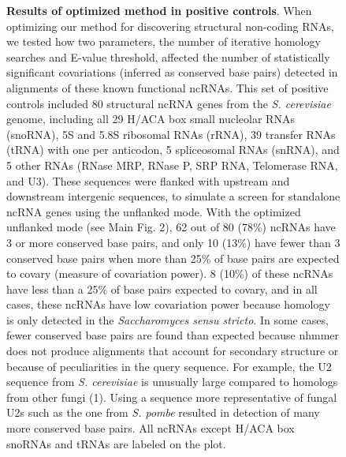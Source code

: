 \documentclass[12pt]{report}
\begin{document}
\begin{figure}[!htb]
	\caption[Results of optimized method in positive controls]{\textbf{Results of optimized method in positive controls}. When optimizing our method for discovering structural non-coding RNAs, we tested how two parameters, the number of iterative homology searches and E-value threshold, affected the number of statistically significant covariations (inferred as conserved base pairs) detected in alignments of these known functional ncRNAs. This set of positive controls included 80 structural ncRNA genes from the \textit{S. cerevisiae} genome, including all 29 H/ACA box small nucleolar RNAs (snoRNA), 5S and 5.8S ribosomal RNAs (rRNA), 39 transfer RNAs (tRNA) with one per anticodon, 5 spliceosomal RNAs (snRNA), and 5 other RNAs (RNase MRP, RNase P, SRP RNA, Telomerase RNA, and U3).  These sequences were flanked with upstream and downstream intergenic sequences, to simulate a screen for standalone ncRNA genes using the unflanked mode. With the optimized unflanked mode (see Main Fig. 2), 62 out of 80 (78\%) ncRNAs have 3 or more conserved base pairs, and only 10 (13\%) have fewer than 3 conserved base pairs when more than 25\% of base pairs are expected to covary (measure of covariation power). 8 (10\%) of these ncRNAs have less than a 25\% of base pairs expected to covary, and in all cases, these ncRNAs have low covariation power because homology is only detected in the \textit{Saccharomyces sensu stricto}. In some cases, fewer conserved base pairs are found than expected because nhmmer does not produce alignments that account for secondary structure or because of peculiarities in the query sequence. For example, the U2 sequence from \textit{S. cerevisiae} is unusually large compared to homologs from other fungi (1). Using a sequence more representative of fungal U2s such as the one from \textit{S. pombe} resulted in detection of many more conserved base pairs. All ncRNAs except H/ACA box snoRNAs and tRNAs are labeled on the plot.}
	\label{fig:S1}
\end{figure}
\end{document}
